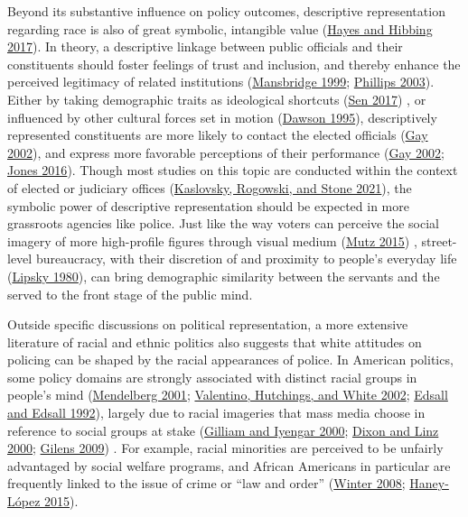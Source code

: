 \documentclass[
  12pt,
]{article}
\begin{document}
Beyond its substantive influence on policy outcomes, descriptive
representation regarding race is also of great symbolic, intangible
value (\protect\hyperlink{ref-hayes2017}{Hayes and Hibbing 2017}). In
theory, a descriptive linkage between public officials and their
constituents should foster feelings of trust and inclusion, and thereby
enhance the perceived legitimacy of related institutions
(\protect\hyperlink{ref-mansbridge1999}{Mansbridge 1999};
\protect\hyperlink{ref-phillips2003}{Phillips 2003}). Either by taking
demographic traits as ideological shortcuts
(\protect\hyperlink{ref-sen2017}{Sen 2017}) , or influenced by other
cultural forces set in motion (\protect\hyperlink{ref-dawson1995}{Dawson
1995}), descriptively represented constituents are more likely to
contact the elected officials (\protect\hyperlink{ref-gay2002}{Gay
2002}), and express more favorable perceptions of their performance
(\protect\hyperlink{ref-gay2002}{Gay 2002};
\protect\hyperlink{ref-jones2016}{Jones 2016}). Though most studies on
this topic are conducted within the context of elected or judiciary
offices (\protect\hyperlink{ref-kaslovsky2021}{Kaslovsky, Rogowski, and
Stone 2021}), the symbolic power of descriptive representation should be
expected in more grassroots agencies like police. Just like the way
voters can perceive the social imagery of more high-profile figures
through visual medium (\protect\hyperlink{ref-mutz2015}{Mutz 2015}) ,
street-level bureaucracy, with their discretion of and proximity to
people's everyday life (\protect\hyperlink{ref-lipsky1980}{Lipsky
1980}), can bring demographic similarity between the servants and the
served to the front stage of the public mind.

Outside specific discussions on political representation, a more
extensive literature of racial and ethnic politics also suggests that
white attitudes on policing can be shaped by the racial appearances of
police. In American politics, some policy domains are strongly
associated with distinct racial groups in people's mind
(\protect\hyperlink{ref-mendelberg2001}{Mendelberg 2001};
\protect\hyperlink{ref-valentino2002}{Valentino, Hutchings, and White
2002}; \protect\hyperlink{ref-edsall1992}{Edsall and Edsall 1992}),
largely due to racial imageries that mass media choose in reference to
social groups at stake (\protect\hyperlink{ref-gilliam2000}{Gilliam and
Iyengar 2000}; \protect\hyperlink{ref-dixon2000}{Dixon and Linz 2000};
\protect\hyperlink{ref-gilens2009}{Gilens 2009}) . For example, racial
minorities are perceived to be unfairly advantaged by social welfare
programs, and African Americans in particular are frequently linked to
the issue of crime or ``law and order''
(\protect\hyperlink{ref-winter2008}{Winter 2008};
\protect\hyperlink{ref-haney-luxf3pez2015}{Haney-López 2015}).
\end{document}
